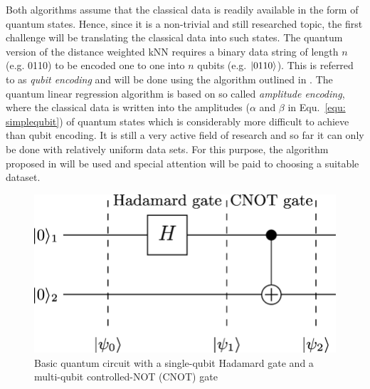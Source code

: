 \documentclass[a4paper]{article}
\newcommand*{\0}{$\ket{0}$}
\newcommand*{\1}{$\ket{1}$}
\begin{document}
Both algorithms assume that the classical data is readily available in the form of quantum states. Hence, since it is a non-trivial and still researched topic, the first challenge will be translating the classical data into such states. The quantum version of the distance weighted kNN requires a binary data string of length $n$ (e.g. 0110) to be encoded one to one into $n$ qubits (e.g. $\ket{0110}$). This is referred to as \textit{qubit encoding} and will be done using the algorithm outlined in \cite{ventura1999initializing}.
The quantum linear regression algorithm is based on so called \textit{amplitude encoding}, where the classical data is written into the amplitudes ($\alpha$ and $\beta$ in Equ.~\ref{equ: simplequbit}) of quantum states which is considerably more difficult to achieve than qubit encoding. It is still a very active field of research and so far it can only be done with relatively uniform data sets. For this purpose, the algorithm proposed in \cite{grover2002creating} will be used and special attention will be paid to choosing a suitable dataset.

\begin{figure}[!ht]
      \centering
       \includegraphics[scale=0.25]{qcircuit.png}
       \caption[caption for qcircuit]{\label{fig:qcircuit} Basic quantum circuit with a single-qubit Hadamard gate and a multi-qubit controlled-NOT (CNOT) gate\footnotemark[2]}
\end{figure}

\end{document}
